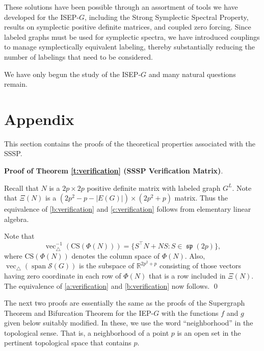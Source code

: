 \documentclass[12pt]{article}
\theoremstyle{definition}
\theoremstyle{definition}
\theoremstyle{definition}
\numberwithin{figure}{section}
\numberwithin{equation}{section}
\newcommand{\Span}{\operatorname{span}}
\newcommand{\SG}{\mathcal{S}(G)}
\newcommand{\spLA}{\operatorname{\mathfrak{sp}}}
\newcommand{\uvec}{\operatorname{vec}_\triangle}
\newcommand{\noi}{\noindent}
\newcommand{\ms}{\medskip}
\begin{document}
These solutions have been possible through an assortment of tools we have developed for the ISEP-$G$, including the Strong Symplectic 
Spectral Property, results on symplectic positive definite matrices, and coupled zero forcing. Since labeled graphs must be used for symplectic spectra, we have introduced couplings to manage symplectically equivalent labeling, thereby substantially reducing the number of labelings that need to be considered.

 We have only begun the study of the ISEP-$G$ and many natural questions remain. 


\appendix
\section{Appendix}\label{appendix}
 This section contains the proofs of the theoretical 
properties associated with the SSSP.

\bigskip\noindent
{\bf Proof of Theorem \ref{t:verification} (SSSP Verification Matrix)}. \ms

\noi
 Recall that  $N$ is a $2p\times 2p$ positive definite matrix with labeled graph $G^L$.
Note that $\Xi(N)$ is a $(2p^2-p -|E(G)|) \times (2p^2+p)$
matrix.  Thus the equivalence of \eqref{b:verification} and \eqref{c:verification} follows from elementary linear algebra. 

Note that  
\[ 
\uvec^{-1} (\mbox{CS}( \Phi(N)))=\{ S^\top N+NS: S \in \spLA(2p)\}
,\] 
where $\mbox{CS}(\Phi(N))$  denotes the column space of
$\Phi(N)$. Also, $\uvec(\Span \SG)$  is
the subspace of $\mathbb{R}^{2p^2+p}$ consisting of those vectors 
having zero coordinate in each row of $\Phi(N)$ that 
is a row included in $\Xi(N)$.
The equivalence of \eqref{a:verification}  and \eqref{b:verification}  now follows. 
\qed\ms

The next two proofs are  essentially the same as the proofs of the Supergraph Theorem  and Bifurcation Theorem for the IEP-$G$ with the 
functions $f$  and $g$ given below  suitably modified.
 In these, we use the word ``neighborhood'' in 
the topological sense. That is, a neighborhood of a point $p$ is an open set in the pertinent topological space that contains $p$. \ms

\medskip
\noi {\bf Proof of Theorem \ref{supergraph} (Supergraph Theorem).}
\end{document}
